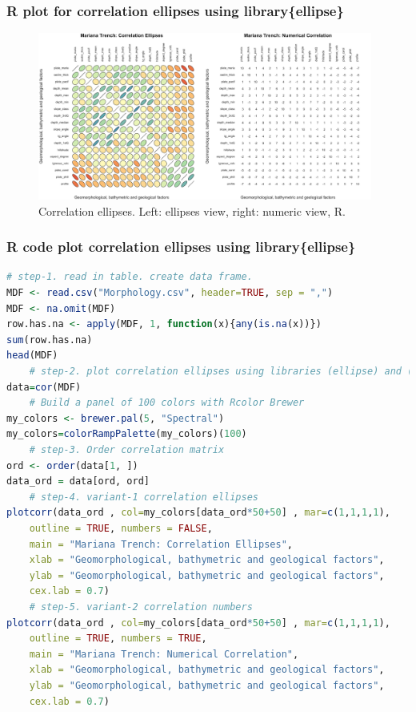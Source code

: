 \documentclass[pdflatex,compress,10pt,
	xcolor={dvipsnames,dvipsnames,svgnames,x11names,table},
	hyperref={colorlinks = true,breaklinks = true, urlcolor = NavyBlue, breaklinks = true}]{beamer}
\begin{document}
\begin{frame}\frametitle{R plot for correlation ellipses using library\{ellipse\}}
\begin{figure}[H]
	\centering
		\includegraphics[width=11cm]{Fig-4-1.jpg}\caption{Correlation ellipses. Left: ellipses view, right: numeric view, R.}
\end{figure}		
\end{frame}

\begin{frame}[fragile]\frametitle{R code plot correlation ellipses using library\{ellipse\}}
\begin{lstlisting}[language=R]
	# step-1. read in table. create data frame.
MDF <- read.csv("Morphology.csv", header=TRUE, sep = ",")
MDF <- na.omit(MDF) 
row.has.na <- apply(MDF, 1, function(x){any(is.na(x))}) 
sum(row.has.na) 
head(MDF)
	# step-2. plot correlation ellipses using libraries (ellipse) and (RColorBrewer)
data=cor(MDF)
	# Build a panel of 100 colors with Rcolor Brewer
my_colors <- brewer.pal(5, "Spectral")
my_colors=colorRampPalette(my_colors)(100)
	# step-3. Order correlation matrix
ord <- order(data[1, ])
data_ord = data[ord, ord]
	# step-4. variant-1 correlation ellipses
plotcorr(data_ord , col=my_colors[data_ord*50+50] , mar=c(1,1,1,1), 
	outline = TRUE, numbers = FALSE,
	main = "Mariana Trench: Correlation Ellipses", 
	xlab = "Geomorphological, bathymetric and geological factors", 
	ylab = "Geomorphological, bathymetric and geological factors", 
	cex.lab = 0.7)
	# step-5. variant-2 correlation numbers	
plotcorr(data_ord , col=my_colors[data_ord*50+50] , mar=c(1,1,1,1), 
	outline = TRUE, numbers = TRUE,
	main = "Mariana Trench: Numerical Correlation", 
	xlab = "Geomorphological, bathymetric and geological factors", 
	ylab = "Geomorphological, bathymetric and geological factors", 
	cex.lab = 0.7)
\end{lstlisting}
\end{frame}
\end{document}

